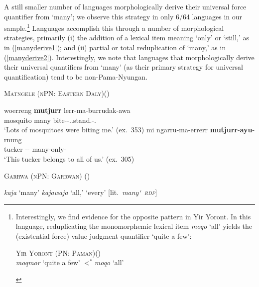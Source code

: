 \documentclass[12pt,egregdoesnotlikesansseriftitles]{scrartcl}
\begin{document}
 A still smaller number of languages morphologically derive their universal force quantifier from `many'; we observe this strategy in only 6/64 languages in our sample.\footnote{Interestingly, we find evidence for the opposite pattern in  Yir Yoront. In this language, reduplicating the monomorphemic lexical item \textit{moqo} `all' yields the (existential force) value judgment quantifier `quite a few':
\vspace{-2mm}
\begin{exe}
  \ex \textsc{Yir Yoront (PN: Paman)}\hfill (\citealt[375]{alpher73})\\
  \textit{\charis moqmor} `quite a few' $<^*$\textit{\charis moqo} `all'
\end{exe}}  Languages accomplish this  through a number of morphological strategies, primarily (i) the addition of a lexical item meaning `only' or `still,' as in (\ref{manyderive1});  and (ii) partial or total reduplication of `many,' as in (\ref{manyderive2}). Interestingly, we note that languages that morphologically derive their universal quantifiers from `many' (as their primary strategy for universal quantification) tend to be non-Pama-Nyungan.

\begin{exe}
  \ex \textsc{Matngele (nPN: Eastern Daly)}\hfill (\citealt{zandvoort99}) \label{manyderive1}
  \begin{xlist}
    \ex \gll woerreng \textbf{mutjurr} lerr-ma-burrudak-awa\\
    mosquito many bite-\Impf-\Third\Aug.\Sarg.stand.\Pst-\First\Min.\Obj\\
    \glt `Lots of mosquitoes were biting me.' (ex.~353) %
    \ex \gll mi ngarru-ma-errerr \textbf{mutjurr}-\textbf{ayu}-rnung\\
    tucker \First\Aug-\Prm-\Incl{} many-only-\Purp\\
    \glt `This tucker belongs to all of us.' (ex.~305)
    \end{xlist}
\ex \textsc{Garrwa (nPN: Garrwan)} \hfill(\citealt[54]{mushin12}) \label{manyderive2}
  \begin{xlist}
    \ex \textit{kaja} `many'
    \ex \textit{kajawaja}  `all,' `every' [lit.\ \textit{many\char`~\textsc{rdp}}]
  \end{xlist}
\end{exe}
\end{document}
